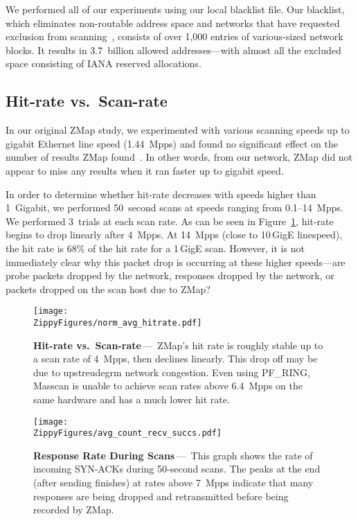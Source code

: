 We performed all of our experiments using our local blacklist file. Our
blacklist, which eliminates non-routable address space and networks that have
requested exclusion from scanning~\cite{state-of-scanning}, consists of over
1,000 entries of various-sized network blocks. It results in 3.7~billion
allowed addresses---with almost all the excluded space consisting of IANA
reserved allocations.

\subsection{Hit-rate vs.\ Scan-rate}

In our original ZMap study, we experimented with various scanning speeds up
to gigabit Ethernet line speed (1.44~Mpps) and found no significant effect on
the number of results ZMap found~\cite{zmap}. In other words, from our
network, ZMap did not appear to miss any results when it ran faster up to
gigabit speed.

In order to determine whether hit-rate decreases with speeds higher than
1~Gigabit, we performed 50~second scans at speeds ranging from 0.1--14~Mpps.
We performed 3~trials at each scan rate. As can be seen in
Figure~\ref{fig:hitrate}, hit-rate begins to drop linearly after 4~Mpps. At
14~Mpps (close to 10\,GigE linespeed), the hit rate is 68\% of the hit rate
for a 1\,GigE scan. However, it is not immediately clear why this packet drop
is occurring at these higher speeds---are probe packets dropped by the
network, responses dropped by the network, or packets dropped on the scan
host due to ZMap?

\begin{figure}[t]\centering
\texttt{[image: \\ZippyFigures/norm\_avg\_hitrate.pdf]}
\caption{\textbf{Hit-rate vs.\ Scan-rate}\,---\,%
ZMap's hit rate is roughly stable up to a scan rate of 4~Mpps, then declines
linearly. This drop off may be due to upstreudegrm network congestion. Even using
PF\_RING, Masscan is unable to achieve scan rates above 6.4~Mpps on the same
hardware and has a much lower hit rate.}
\label{fig:hitrate}
\end{figure}

\begin{figure}[t]\centering
\texttt{[image: \\ZippyFigures/avg\_count\_recv\_succs.pdf]}
\caption{\textbf{Response Rate During Scans}\,---\,%
This graph shows the rate of incoming SYN-ACKs during 50-second scans. The
peaks at the end (after sending finishes) at rates above 7~Mpps indicate that
many responses are being dropped and retransmitted before being recorded by
ZMap.}
\label{fig:recvrate}
\end{figure}

